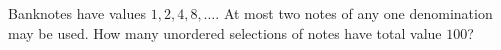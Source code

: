 Banknotes have values $1,2,4,8,\ldots$. At most two notes of any one denomination may be used. How many unordered selections of notes have total value $100$?
